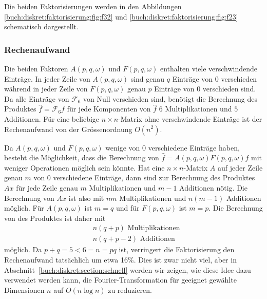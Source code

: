 Die beiden Faktorisierungen werden in den Abbildungen
\ref{buch:diskret:faktorisierung:fig:f32}
und
\ref{buch:diskret:faktorisierung:fig:f23}
schematisch dargestellt.


%
%
\subsubsection{Rechenaufwand}
Die beiden Faktoren $A(p,q,\omega)$ und $F(p,q,\omega)$ enthalten
viele verschwindende Einträge.
In jeder Zeile von $A(p,q,\omega)$ sind genau $q$ Einträge von
$0$ verschieden während in jeder Zeile von $F(p,q,\omega)$ genau
$p$ Einträge von $0$ verschieden sind.
Da alle Einträge von $\mathscr{F}_6$ von Null verschieden sind, benötigt
die Berechnung des Produktes $\hat{f}=\mathscr{F}_6f$ für jede
Komponenten von $\hat{f}$ $6$ Multiplikationen und $5$ Additionen.
Für eine beliebige $n\times n$-Matrix ohne verschwindende Einträge
ist der Rechenaufwand von der Grössenordnung $O(n^2)$.

Da $A(p,q,\omega)$ und $F(p,q,\omega)$ wenige von $0$ verschiedene
Einträge haben, besteht die Möglichkeit, dass die Berechnung
von $\hat{f}=A(p,q,\omega)F(p,q,\omega)f$ mit weniger Operationen
möglich sein könnte.
Hat eine $n\times n$-Matrix $A$ auf jeder Zeile genau $m$ von $0$
verschiedene Einträge, dann sind zur Berechnung des Produktes $Ax$
für jede Zeile genau $m$ Multiplikationen und $m-1$ Additionen
nötig.
Die Berechnung von $Ax$ ist also mit $nm$ Multiplikationen und 
$n(m-1)$ Additionen möglich.
Für $A(p,q,\omega)$ ist $m=q$ und für $F(p,q,\omega)$ ist $m=p$.
Die Berechnung von des Produktes ist daher mit
\begin{align*}
&n(q+p)\text{ Multiplikationen}
\\
&n(q+p-2)\text{ Additionen}
\end{align*}
möglich.
Da $p+q=5<6=n=pq$ ist, verringert die Faktorisierung den Rechenaufwand
tatsächlich um etwa 16\%.
Dies ist zwar nicht viel, aber in Abschnitt~\ref{buch:diskret:section:schnell}
werden wir zeigen, wie diese Idee dazu verwendet werden kann, die
Fourier-Transformation für geeignet gewählte Dimensionen $n$ auf
$O(n\log n)$ zu reduzieren.

